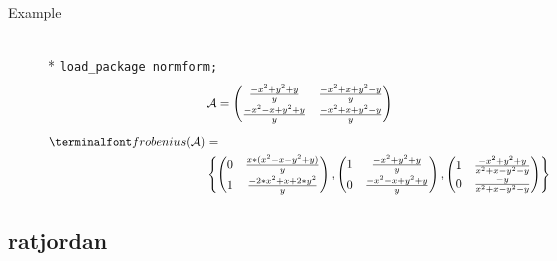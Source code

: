 \begin{description}
\item[Example]\mbox{}\\*
\texttt{load\_package normform;}
\begin{gather*}
\mathcal{A} = \begin{pmatrix} \frac{-x^2+y^2+y}{y} & 
\frac{-x^2+x+y^2-y}{y} \\[1mm] \frac{-x^2-x+y^2+y}{y} & \frac{-x^2+x+y^2-y}
{y} \end{pmatrix} \\[2mm]
\begin{split}
\f{frobenius}(\mathcal{A}) &=  \\
&\left\{
   \begin{pmatrix} 0 & \frac{x*(x^2-x-y^2+y)}{y} \\[1mm]
                   1 & \frac{-2*x^2+x+2*y^2}{y} \end{pmatrix},
   \begin{pmatrix}
     1 & \frac{-x^2+y^2+y}{y} \\[1mm] 0 & \frac{-x^2-x+y^2+y}{y}
   \end{pmatrix},
   \begin{pmatrix} 1 & \frac{-x^2+y^2+y}{x^2+x-y^2-y} \\[1mm]
      0 & \frac{-y}{x^2+x-y^2-y} \end{pmatrix}
 \right\}
\end{split}
\end{gather*}
\end{description}

\subsection{ratjordan}

